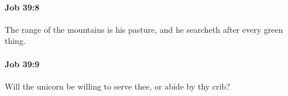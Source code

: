 		\paragraph{Job 39:8} %
			\label{JOB-39-8}

			The range of the mountains is his pasture, and he searcheth after every green thing.


		\paragraph{Job 39:9} %
			\label{JOB-39-9}

			Will the unicorn be willing to serve thee, or abide by thy crib?


